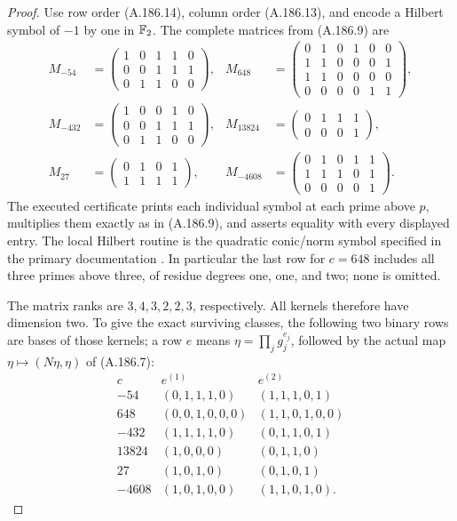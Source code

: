 \begin{proof}
Use row order (A.186.14), column order (A.186.13), and
encode a Hilbert symbol of \(-1\) by one in \(\mathbb F_2\).
The complete matrices from (A.186.9) are
\[
\begin{aligned}
M_{-54}&=\begin{pmatrix}1&0&1&1&0\\0&0&1&1&1\\0&1&1&0&0\end{pmatrix},
&M_{648}&=\begin{pmatrix}0&1&0&1&0&0\\1&1&0&0&0&1\\1&1&0&0&0&0\\0&0&0&0&1&1\end{pmatrix},\\
M_{-432}&=\begin{pmatrix}1&0&0&1&0\\0&0&1&1&1\\0&1&1&0&0\end{pmatrix},
&M_{13824}&=\begin{pmatrix}0&1&1&1\\0&0&0&1\end{pmatrix},\\
M_{27}&=\begin{pmatrix}0&1&0&1\\1&1&1&1\end{pmatrix},
&M_{-4608}&=\begin{pmatrix}0&1&0&1&1\\1&1&1&0&1\\0&0&0&0&1\end{pmatrix}.
\end{aligned}
\tag{A.186.15}
\]
The executed certificate prints each individual symbol at
each prime above \(p\), multiplies them exactly as in
(A.186.9), and asserts equality with every displayed entry.
The local Hilbert routine is the quadratic conic/norm
symbol specified in the primary documentation
\cite[entry \texttt{nfhilbert}]{LegPariNumberFields}.
In particular the last row for \(c=648\) includes all
three primes above three, of residue degrees one, one,
and two; none is omitted.

The matrix ranks are \(3,4,3,2,2,3\), respectively.
All kernels therefore have dimension two.  To give the
exact surviving classes, the following two binary rows
are bases of those kernels; a row \(e\) means
\(\eta=\prod_jg_j^{e_j}\), followed by the actual map
\(\eta\mapsto(N\eta,\eta)\) of (A.186.7):
\[
\begin{array}{r|c|c}
c&e^{(1)}&e^{(2)}\\ \hline
-54&(0,1,1,1,0)&(1,1,1,0,1)\\
648&(0,0,1,0,0,0)&(1,1,0,1,0,0)\\
-432&(1,1,1,1,0)&(0,1,1,0,1)\\
13824&(1,0,0,0)&(0,1,1,0)\\
27&(1,0,1,0)&(0,1,0,1)\\
-4608&(1,0,1,0,0)&(1,1,0,1,0).
\end{array}
\tag{A.186.16}
\]


\end{proof}
